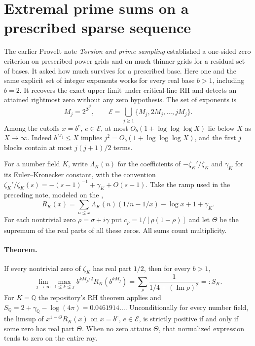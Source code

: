 \section{Extremal prime sums on a prescribed sparse sequence}\label{sec:sampling}

The earlier ProveIt note \emph{Torsion and prime sampling} established a
one-sided zero criterion on prescribed power grids and on much thinner
grids for a residual set of bases. It asked how much survives for a
prescribed base. Here one and the same explicit set of integer exponents
works for every real base $b>1$, including $b=2$. It recovers the exact
upper limit under critical-line RH and detects an attained rightmost
zero without any zero hypothesis. The set of exponents is
\[
 M_j=2^{2^{j^2}},\qquad
 \mathcal E=\bigcup_{j\ge1}\{M_j,2M_j,\ldots,jM_j\}.
\]
Among the cutoffs $x=b^e$, $e\in\mathcal E$, at most
$O_b(1+\log\log\log X)$ lie below $X$ as $X\to\infty$.
Indeed $b^{M_j}\le X$ implies $j^2=O_b(1+\log\log\log X)$,
and the first $j$ blocks contain at most $j(j+1)/2$ terms.

For a number field $K$, write $\Lambda_K(n)$ for the coefficients of
$-\zeta_K'/\zeta_K$ and $\gamma_K$ for its Euler--Kronecker constant,
with the convention $\zeta_K'/\zeta_K(s)=-(s-1)^{-1}+\gamma_K+O(s-1)$.
Take the ramp used in the preceding note, modeled on the ,
\[
 R_K(x)=\sum_{n\le x}\Lambda_K(n)(1/n-1/x)-\log x+1+\gamma_K.
\]
For each nontrivial zero $\rho=\sigma+i\gamma$ put
$c_\rho=1/[\rho(1-\rho)]$ and let $\Theta$ be the supremum of the
real parts of all these zeros. All sums count multiplicity.

\paragraph{Theorem.}
If every nontrivial zero of $\zeta_K$ has real part $1/2$, then
for every $b>1$,
\[
 \lim_{j\to\infty}\max_{1\le k\le j}
 b^{kM_j/2}R_K(b^{kM_j})
 = \sum_{\rho}\frac{1}{1/4+(\operatorname{Im}\rho)^2}
 =: S_K.
\]
For $K=\mathbb Q$ the repository's RH theorem applies and
$S_{\mathbb Q}=2+\gamma_{\mathbb Q}-\log(4\pi)
=0.0461914\ldots$.
Unconditionally for every number field, the limsup of
$x^{1-\Theta}R_K(x)$ on $x=b^e$, $e\in\mathcal E$, is strictly positive
if and only if some zero has real part $\Theta$. When no zero attains
$\Theta$, that normalized expression tends to zero on the entire ray.

